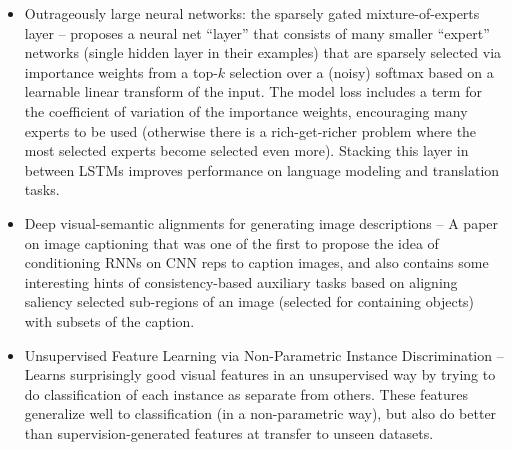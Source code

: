 \documentclass[11pt]{article}
\begin{document}
\begin{itemize}
\item Outrageously large neural networks: the sparsely gated mixture-of-experts layer -- proposes a neural net ``layer'' that consists of many smaller ``expert'' networks (single hidden layer in their examples) that are sparsely selected via importance weights from a top-$k$ selection over a (noisy) softmax based on a learnable linear transform of the input. The model loss includes a term for the coefficient of variation of the importance weights, encouraging many experts to be used (otherwise there is a rich-get-richer problem where the most selected experts become selected even more). Stacking this layer in between LSTMs improves performance on language modeling and translation tasks. \citep{Shazeer2017} 
\item Deep visual-semantic alignments for generating image descriptions -- A paper on image captioning that was one of the first to propose the idea of conditioning RNNs on CNN reps to caption images, and also contains some interesting hints of consistency-based auxiliary tasks based on aligning saliency selected sub-regions of an image (selected for containing objects) with subsets of the caption. \citep{Karpathy2017} 
\item Unsupervised Feature Learning via Non-Parametric Instance Discrimination -- Learns surprisingly good visual features in an unsupervised way by trying to do classification of each instance as separate from others. These features generalize well to classification (in a non-parametric way), but also do better than supervision-generated features at transfer to unseen datasets. \citep{Wu2018}

\end{itemize}
\end{document}
